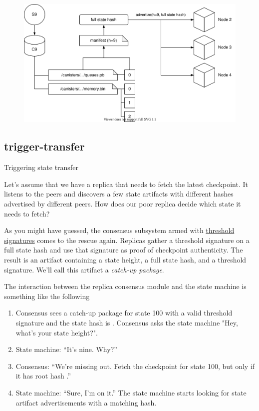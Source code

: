\documentclass{article}
\begin{document}
\begin{figure}[grayscale-diagram]
\includegraphics{images/02-checkpoint-artifact.svg}
\end{figure}

\subsection{trigger-transfer}{Triggering state transfer}

Let's assume that we have a replica that needs to fetch the latest checkpoint.
It listens to the peers and discovers a few state artifacts with different hashes advertised by different peers.
How does our poor replica decide which state it needs to fetch?

As you might have guessed, the consensus subsystem armed with \href{https://en.wikipedia.org/wiki/Threshold_cryptosystem}{threshold signatures} comes to the rescue again.
Replicas gather a threshold signature on a full state hash and use that signature as proof of checkpoint authenticity.
The result is an artifact containing a state height, a full state hash, and a threshold signature.
We'll call this artifact a \emph{catch-up package}.

The interaction between the replica consensus module and the state machine is something like the following
\begin{enumerate}
\item 
  Consensus sees a catch-up package for state 100 with a valid threshold signature and the state hash is .
  Consensus asks the state machine "Hey, what's your state height?".
\item State machine: ``It's nine. Why?''
\item Consensus: ``We're missing out. Fetch the checkpoint for state 100, but only if it has root hash .''
\item State machine: ``Sure, I'm on it.'' The state machine starts looking for state artifact advertisements with a matching hash.
\end{enumerate}
\end{document}
